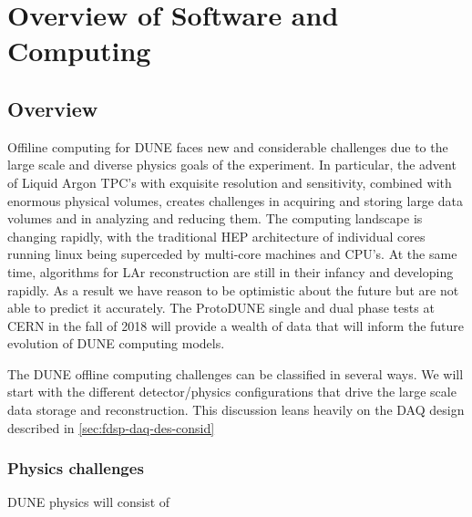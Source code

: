%
\chapter{Overview of Software and Computing }

\section{Overview}

Offiline computing for DUNE faces new and considerable challenges due to the large scale and diverse physics goals of the experiment.  In particular, the advent of Liquid Argon TPC's with exquisite resolution and sensitivity, combined with enormous physical volumes, creates challenges in acquiring and storing large data volumes and in analyzing and reducing them.  The computing landscape is changing rapidly, with the traditional HEP architecture of individual cores running linux being superceded by multi-core machines and CPU's. At the same time, algorithms for LAr reconstruction are still in their infancy and developing rapidly.  As a result we have reason to be optimistic about the future but are not able to predict it accurately.  The ProtoDUNE single and dual phase tests at CERN in the fall of 2018 will provide a wealth of data that will inform the future evolution of DUNE computing models.

The DUNE offline computing challenges can be classified in several ways.  We will start with the different detector/physics configurations that drive the large scale data storage and reconstruction. 
This discussion leans heavily on the DAQ design described in \ref{sec:fdsp-daq-des-consid}


\subsection{Physics challenges}

DUNE physics will consist of 

